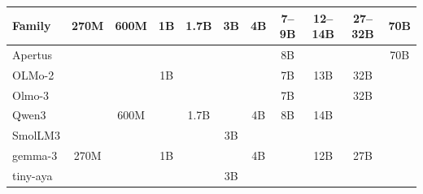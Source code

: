 \begin{tabular}{lcccccccccc}
\toprule
Family & 270M & 600M & 1B & 1.7B & 3B & 4B & 7--9B & 12--14B & 27--32B & 70B \\
\midrule
Apertus &  &  &  &  &  &  & 8B &  &  & 70B \\
OLMo-2 &  &  & 1B &  &  &  & 7B & 13B & 32B &  \\
Olmo-3 &  &  &  &  &  &  & 7B &  & 32B &  \\
Qwen3 &  & 600M &  & 1.7B &  & 4B & 8B & 14B &  &  \\
SmolLM3 &  &  &  &  & 3B &  &  &  &  &  \\
gemma-3 & 270M &  & 1B &  &  & 4B &  & 12B & 27B &  \\
tiny-aya &  &  &  &  & 3B &  &  &  &  &  \\
\bottomrule
\end{tabular}
